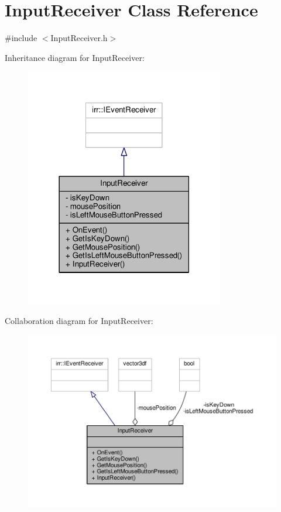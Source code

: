 \hypertarget{class_input_receiver}{\section{Input\-Receiver Class Reference}
\label{class_input_receiver}
}


{\ttfamily \#include $<$Input\-Receiver.\-h$>$}



Inheritance diagram for Input\-Receiver\-:
\nopagebreak
\begin{figure}[H]
\begin{center}
\leavevmode
\includegraphics[width=246pt]{class_input_receiver__inherit__graph}
\end{center}
\end{figure}


Collaboration diagram for Input\-Receiver\-:
\nopagebreak
\begin{figure}[H]
\begin{center}
\leavevmode
\includegraphics[width=350pt]{class_input_receiver__coll__graph}
\end{center}
\end{figure}

